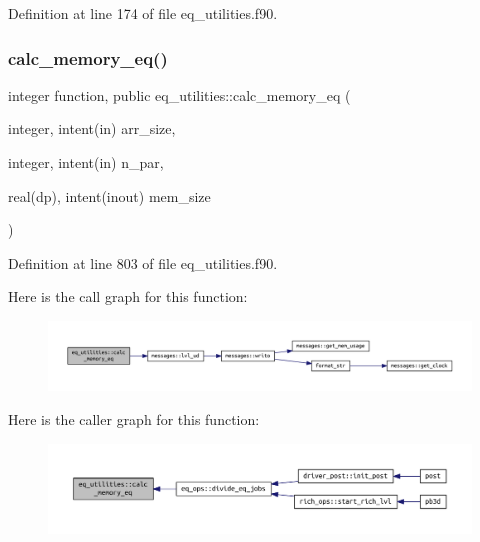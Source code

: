 Definition at line 174 of file eq\+\_\+utilities.\+f90.

\mbox{\label{namespaceeq__utilities_a5a9f230ed9a6e627e31e882e9f4a00a1}} 
\subsubsection{\texorpdfstring{calc\+\_\+memory\+\_\+eq()}{calc\_memory\_eq()}}
{\footnotesize\ttfamily integer function, public eq\+\_\+utilities\+::calc\+\_\+memory\+\_\+eq (\begin{DoxyParamCaption}\item[{integer, intent(in)}]{arr\+\_\+size,  }\item[{integer, intent(in)}]{n\+\_\+par,  }\item[{real(dp), intent(inout)}]{mem\+\_\+size }\end{DoxyParamCaption})}



Definition at line 803 of file eq\+\_\+utilities.\+f90.

Here is the call graph for this function\+:
\nopagebreak
\begin{figure}[H]
\begin{center}
\leavevmode
\includegraphics[width=350pt]{namespaceeq__utilities_a5a9f230ed9a6e627e31e882e9f4a00a1_cgraph}
\end{center}
\end{figure}
Here is the caller graph for this function\+:
\nopagebreak
\begin{figure}[H]
\begin{center}
\leavevmode
\includegraphics[width=350pt]{namespaceeq__utilities_a5a9f230ed9a6e627e31e882e9f4a00a1_icgraph}
\end{center}
\end{figure}
\mbox{\label{namespaceeq__utilities_a5109472305101af3a15e8e8717c426fd}} 
